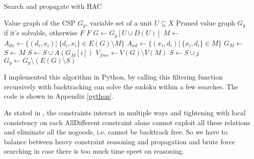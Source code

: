 \documentclass[a4paper, 12pt]{report}
\begin{document}
            \begin{algorithm}
                \caption{Search and propagate with HAC}
                \label{HAC}
                \begin{algorithmic}[1]
                    \Require Value graph of the CSP $G_g$, variable set of a unit $U\subseteq X$
                    \Ensure Pruned value graph $G_g$ if it's solvable, otherwise $F$
                            \State \Return $F$
                        \EndIf
                        \State $G\gets G_g[U\cup D(U)]$ 
                        \State $M\gets$ 
                        \State $A_{dx}\gets \{(d_i,x_i)|\ \{d_i,x_i\}\in E(G)\setminus M \}$
                        \State $A_{xd}\gets \{(x_i,d_i)|\ \{x_i,d_i\}\in M\}$ 
                        \State $G_M\gets$ 
                        \State $S\gets M$
                            \State $S \gets S\cup A(G_M[i])$
                        \EndFor
                        \State $V_{free} \gets V(G)\setminus V(M)$
                             
                                    \State $S\gets S\cup j$
                                \EndFor
                            \EndFor
                        \EndIf
                        \State $G_g\gets G_g \setminus(E(G)\setminus S)$
                    \EndFunction
                \end{algorithmic}
            \end{algorithm}

            I implemented this algorithm in Python, by calling this filtering function recursively with backtracking can solve the sudoku within a few searches. The code is shown in Appendix \ref{python}.
                        

            As stated in \cite{simonis2005sudoku}, the constraints interact in multiple ways and tightening with local consistency on each AllDifferent constraint alone cannot exploit all these relations and eliminate all the nogoods, i.e. cannot be backtrack free. So we have to balance between heavy constraint reasoning and propagation and brute force searching in case there is too much time speet on reasoning.
\end{document}
